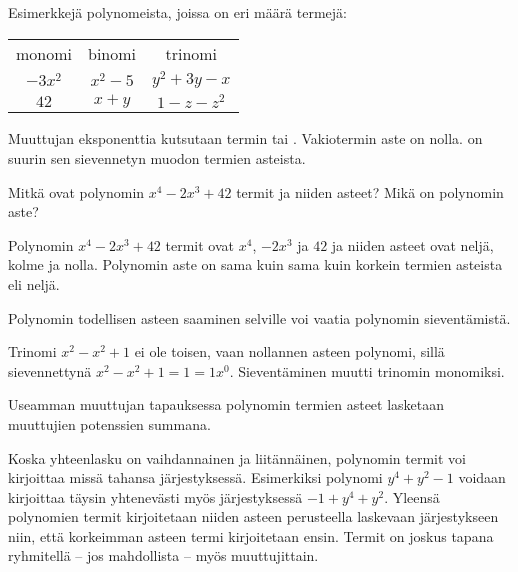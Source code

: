 \begin{esimerkki}
Esimerkkejä polynomeista, joissa on eri määrä termejä:
\begin{center}\begin{tabular}{ccc}
monomi	& binomi 	&	trinomi \\
$-3x^2$   & $x^2-5$	& $y^2+3y-x$ \\
$42$		& $x+y$ 	& $1-z-z^2$ \\
 \end{tabular} \end{center}
 \end{esimerkki}

Muuttujan eksponenttia kutsutaan termin  tai . Vakiotermin aste on nolla.  on suurin sen sievennetyn muodon termien asteista.

\begin{esimerkki}
    Mitkä ovat polynomin $x^4-2x^3+42$ termit ja niiden asteet? Mikä on polynomin aste?
    \begin{esimvast}
        Polynomin $x^4-2x^3+42$ termit ovat $x^4$, $-2x^3$ ja $42$ ja niiden asteet ovat neljä, kolme ja nolla. Polynomin aste on sama kuin sama kuin korkein termien asteista eli neljä.
    \end{esimvast}
\end{esimerkki}

Polynomin todellisen asteen saaminen selville voi vaatia polynomin sieventämistä.

\begin{esimerkki}
Trinomi $x^2-x^2+1$ ei ole toisen, vaan nollannen asteen polynomi, sillä sievennettynä $x^2-x^2+1=1=1x^0$. Sieventäminen muutti trinomin monomiksi.
\end{esimerkki}

Useamman muuttujan tapauksessa polynomin termien asteet lasketaan muuttujien potenssien summana.

\begin{esimerkki}
\end{esimerkki}

Koska yhteenlasku on vaihdannainen ja liitännäinen, polynomin termit voi kirjoittaa missä tahansa järjestyksessä. Esimerkiksi polynomi $y^4+y^2-1$ voidaan kirjoittaa täysin yhtenevästi myös järjestyksessä $-1+y^4+y^2$. Yleensä polynomien termit kirjoitetaan niiden asteen perusteella laskevaan järjestykseen niin, että korkeimman asteen termi kirjoitetaan ensin. Termit on joskus tapana ryhmitellä -- jos mahdollista -- myös muuttujittain.

